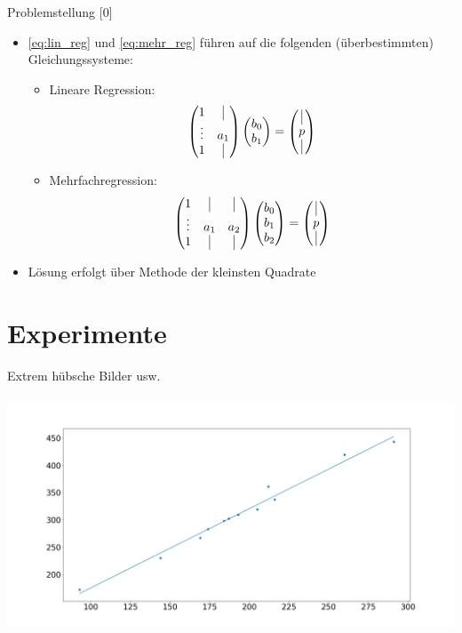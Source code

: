 \documentclass{beamer}
\begin{document}
\begin{frame}{Problemstellung [0]}
\begin{itemize}
\item \eqref{eq:lin_reg} und \eqref{eq:mehr_reg} führen auf die folgenden (überbestimmten) Gleichungssysteme:
\begin{itemize}
\item Lineare Regression:
\begin{align}
\begin{pmatrix}
1 & \vrule \\
\vdots & a_1\\
1 & \vrule
\end{pmatrix}
\begin{pmatrix}
b_0\\
b_1
\end{pmatrix}
=
\begin{pmatrix}
\vrule\\
p\\
\vrule
\end{pmatrix}
\end{align}
\item Mehrfachregression:
\begin{align}
\begin{pmatrix}
1 & \vrule & \vrule\\
\vdots & a_1&a_2\\
1 & \vrule &\vrule
\end{pmatrix}
\begin{pmatrix}
b_0\\
b_1\\
b_2
\end{pmatrix}
=
\begin{pmatrix}
\vrule\\
p\\
\vrule
\end{pmatrix}
\end{align}
\end{itemize}
\item Lösung erfolgt über Methode der kleinsten Quadrate
\end{itemize}
\end{frame}

\section{Experimente}
\begin{frame}
Extrem hübsche Bilder usw.\\~\\
\includegraphics[width=\textwidth]{Beispielbild}
\end{frame}
\end{document}
